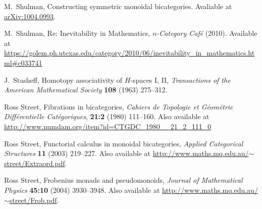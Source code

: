 \documentclass{article}
\begin{document}
\begin{thebibliography}{99}
 M.\ Shulman, Constructing symmetric monoidal
bicategories.  Avaliable at \href{http://arxiv.org/abs/1004.0993}
{arXiv:1004.0993}.

 M.\ Shulman, Re: Inevitability in Mathematics,
\textsl{$n$-Category Caf\'e} (2010).  Available at
\href{https://golem.ph.utexas.edu/category/2010/06/inevitability_in_mathematics.html#c033741}
{https://golem.ph.utexas.edu/category/2010/06/inevitability\_in\_mathematics.html\#c033741}

 J.\ Stasheff, Homotopy associativity of $H$-spaces I,
II, \textsl{Transactions of the American Mathematical Society} \textbf{108} (1963) 275--312.

 Ross Street, Fibrations in bicategories, \textsl
{Cahiers de Topologie et G\'eom\'etrie Diff\'erentielle Cat\'egoriques}, 
\textbf{21:2} (1980) 111--160.  Also available at 
\href{http://www.numdam.org/item?id=CTGDC_1980__21_2_111_0}
{http://www.numdam.org/item?id=CTGDC\_1980\_\_21\_2\_111\_0}

 Ross Street, Functorial calculus in monoidal
bicategories, \textsl{Applied Categorical Structures} \textbf{11} (2003)
219--227.  Also available at 
\href{http://www.maths.mq.edu.au/~street/Extraord.pdf}
{http://www.maths.mq.edu.au/$\sim$street/Extraord.pdf}.

 Ross Street, Frobenius monads and pseudomonoids,
\textsl{Journal of Mathematical Physics} \textbf{45:10} (2004) 3930--3948. 
Also available at
\href{http://www.maths.mq.edu.au/~street/Frob.pdf}
{http://www.maths.mq.edu.au/$\sim$street/Frob.pdf}.

\end{thebibliography}
\end{document}

